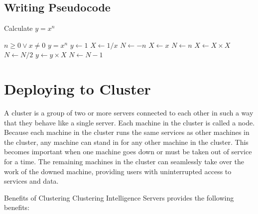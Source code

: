 \documentclass[12pt]{article}
\begin{document}
\begin{figure}[!h]
\end{figure}


\newpage
\subsection{Writing Pseudocode}
\begin{algorithm}
\caption{Calculate $y = x^n$}
\begin{algorithmic}
\REQUIRE $n \geq 0 \vee x \neq 0$
\ENSURE $y = x^n$
\STATE $y \leftarrow 1$
\STATE $X \leftarrow 1 / x$
\STATE $N \leftarrow -n$
\ELSE
\STATE $X \leftarrow x$
\STATE $N \leftarrow n$
\ENDIF
{}
\STATE $X \leftarrow X \times X$
\STATE $N \leftarrow N / 2$
\ELSE[$N$ is odd]
\STATE $y \leftarrow y \times X$
\STATE $N \leftarrow N - 1$
\ENDIF
\ENDWHILE
\end{algorithmic}
\end{algorithm}


\newpage
\section{Deploying to Cluster}
A cluster is a group of two or more servers connected to each other in such a way that they behave like a single server. Each machine in the cluster is called a node. Because each machine in the cluster runs the same services as other machines in the cluster, any machine can stand in for any other machine in the cluster. This becomes important when one machine goes down or must be taken out of service for a time. The remaining machines in the cluster can seamlessly take over the work of the downed machine, providing users with uninterrupted access to services and data.

Benefits of Clustering
Clustering Intelligence Servers provides the following benefits:
\end{document}
